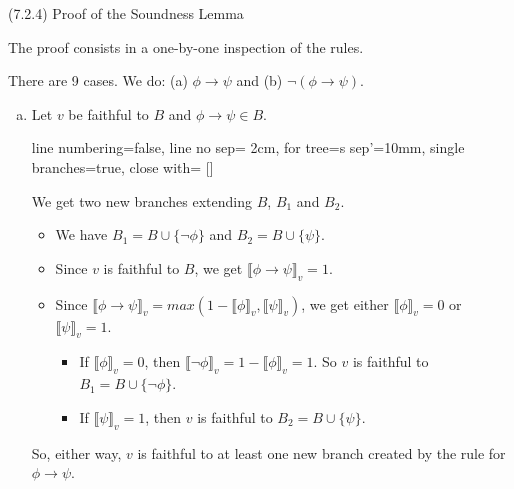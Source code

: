 \begin{frame}{(7.2.4)  Proof of the Soundness Lemma}

The proof consists in a one-by-one inspection of the rules.

There are 9 cases. We do: (a) $\phi\to\psi$ and (b) $\neg(\phi\to \psi)$.
		
		\begin{enumerate}[(a)]
					
		\item Let $v$ be faithful to $B$ and $\phi\to\psi\in B$.
		
					\begin{center}
					\begin{prooftree}
					{
					line numbering=false,
					line no sep= 2cm,
					for tree={s sep'=10mm},
					single branches=true,
					close with=\xmark
					}
					[\phi\to\psi [\neg \phi ] [\psi ] ]
					\end{prooftree}
					\end{center}
					
			We get two new branches extending $B$, $B_1$ and $B_2$. 
			
			\begin{itemize}
						
			\item We have $B_1=B\cup\{\neg\phi\}$ and $B_2=B\cup\{\psi\}$. 
			
			\item Since $v$ is faithful to $B$, we get $\llbracket\phi\to\psi\rrbracket_v=1$. 
			
			\item Since $\llbracket\phi\to\psi\rrbracket_v=max(1-\llbracket\phi\rrbracket_v,\llbracket\psi\rrbracket_v)$, we get either $\llbracket\phi\rrbracket_v=0$ or $\llbracket\psi\rrbracket_v=1$.
			
			\begin{itemize}
		
			\item If $\llbracket\phi\rrbracket_v=0$, then $\llbracket\neg\phi\rrbracket_v=1-\llbracket\phi\rrbracket_v=1$. So $v$ is faithful to $B_1=B\cup\{\neg\phi\}$. 
		
			\item If $\llbracket\psi\rrbracket_v=1$, then $v$ is faithful to $B_2=B\cup\{\psi\}$.
	
		
			\end{itemize}
		
		\end{itemize}
	So, either way, $v$ is faithful to at least one new branch created by the rule for $\phi\to\psi$.
	
	\end{enumerate}
	
\end{frame}


